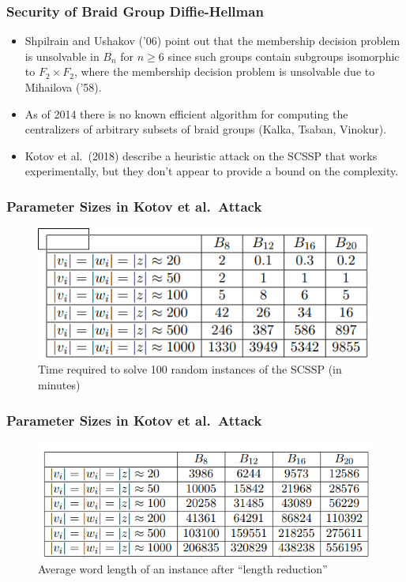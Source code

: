 \documentclass{beamer}
\begin{document}
\begin{frame}
	\frametitle{Security of Braid Group Diffie-Hellman}
	\begin{itemize}
		\item Shpilrain and Ushakov ('06) point out that the membership decision problem is unsolvable in $B_n$ for $n\geq 6$ since such groups contain subgroups isomorphic to $F_2\times F_2$, where the membership decision problem is unsolvable due to Mihailova ('58).\pause
		\item As of 2014 there is no known efficient algorithm for computing the centralizers of arbitrary subsets of braid groups (Kalka, Tsaban, Vinokur).\pause
		\item Kotov et al.\ (2018) describe a heuristic attack on the SCSSP that works experimentally, but they don't appear to provide a bound on the complexity.
	\end{itemize}
\end{frame}

\begin{frame}
	\frametitle{Parameter Sizes in Kotov et al.\ Attack}
	\begin{figure}[h]
		\centering
		\includegraphics[scale=.5]{time.png}
		\caption{Time required to solve 100 random instances of the SCSSP (in minutes)}
	\end{figure}
\end{frame}

\begin{frame}
	\frametitle{Parameter Sizes in Kotov et al.\ Attack}
	\begin{figure}[h]
		\centering
		\includegraphics[scale=.5]{length.png}
		\caption{Average word length of an instance after ``length reduction''}
	\end{figure}
\end{frame}
\end{document}
